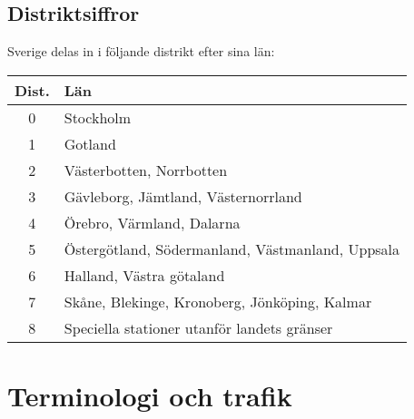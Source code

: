 \subsection{Distriktsiffror}

Sverige delas in i följande distrikt efter sina län:

\begin{center}
\begin{tabular}{cl}
	\textbf{Dist.} & \textbf{Län}                                     \\ \hline
	      0        & Stockholm                                        \\
	      1        & Gotland                                          \\
	      2        & Västerbotten, Norrbotten                         \\
	      3        & Gävleborg, Jämtland, Västernorrland              \\
	      4        & Örebro, Värmland, Dalarna                        \\
	      5        & Östergötland, Södermanland, Västmanland, Uppsala \\
	      6        & Halland, Västra götaland                         \\
	      7        & Skåne, Blekinge, Kronoberg, Jönköping, Kalmar    \\
	      8        & Speciella stationer utanför landets gränser
\end{tabular}
\end{center}

\section{Terminologi och trafik}
